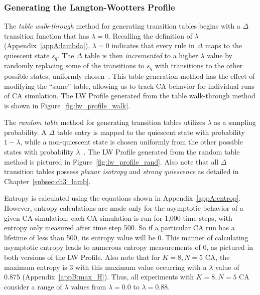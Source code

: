 \documentclass[a4paper,11pt]{article}
\begin{document}
\subsubsection*{Generating the Langton-Wootters Profile}

The \textit{table walk-through} method for generating transition tables begins with a $\Delta$ transition function that has $\lambda = 0$. Recalling the definition of $\lambda$ (Appendix~\ref{appA:lambda}), $\lambda=0$ indicates that every rule in $\Delta$ maps to the quiescent state $s_q$. The $\Delta$ table is then \textit{incremented} to a higher $\lambda$ value by randomly replacing some of the transitions to $s_q$ with transitions to the other possible states, uniformly chosen~\cite{la90}. This table generation method has the effect of modifying the ``same'' table, allowing us to track CA behavior for individual runs of CA simulation. The LW Profile generated from the table walk-through method is shown in Figure~\ref{fig:lw_profile_walk}.

The \textit{random table} method for generating transition tables utilizes $\lambda$ as a sampling probability. A $\Delta$ table entry is mapped to the quiescent state with probability $1 - \lambda$, while a non-quiescent state is chosen uniformly from the other possible states with probability $\lambda$~\cite{la90}. The LW Profile generated from the random table method is pictured in Figure~\ref{fig:lw_profile_rand}. Also note that all $\Delta$ transition tables possess \textit{planar isotropy} and \textit{strong quiescence} as detailed in Chapter~\ref{subsec:ch3_lamb}.

Entropy is calculated using the equations shown in Appendix~\ref{appA:entrop}. However, entropy calculations are made only for the asymptotic behavior of a given CA simulation: each CA simulation is run for 1,000 time steps, with entropy only measured after time step 500. So if a particular CA run has a lifetime of less than 500, its entropy value will be 0. This manner of calculating asymptotic entropy leads to numerous entropy measurements of 0, as pictured in both versions of the LW Profile. Also note that for $K=8, N=5$ CA, the maximum entropy is 3 with this maximum value occurring with a $\lambda$ value of 0.875 (Appendix~\ref{appB:max_H}). Thus, all experiments with $K=8, N=5$ CA consider a range of $\lambda$ values from $\lambda = 0.0$ to $\lambda = 0.88$. 
\end{document}
